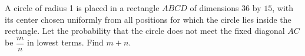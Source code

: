 A circle of radius 1 is placed in a rectangle $ABCD$ of dimensions $36$ by $15$, with its center chosen uniformly from all positions for which the circle lies inside the rectangle. Let the probability that the circle does not meet the fixed diagonal $AC$ be $\dfrac{m}{n}$ in lowest terms. Find $m+n$.

